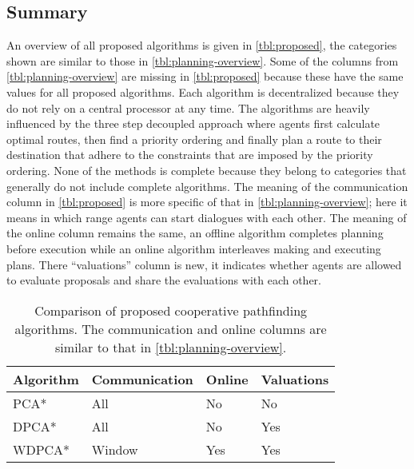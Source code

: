 \subsection{Summary}
An overview of all proposed algorithms is given in \autoref{tbl:proposed}, the
categories shown are similar to those in \autoref{tbl:planning-overview}. Some
of the columns from \autoref{tbl:planning-overview} are missing in
\autoref{tbl:proposed} because these have the same values for all proposed
algorithms. Each algorithm is decentralized because they do not rely on a
central processor at any time. The algorithms are heavily influenced by the
three step decoupled approach where agents first calculate optimal routes, then
find a priority ordering and finally plan a route to their destination that
adhere to the constraints that are imposed by the priority ordering. None of
the methods is complete because they belong to categories that generally do not
include complete algorithms. The meaning of the communication column in
\autoref{tbl:proposed} is more specific of that in
\autoref{tbl:planning-overview}; here it means in which range agents can start
dialogues with each other. The meaning of the online column remains the same,
an offline algorithm completes planning before execution while an online
algorithm interleaves making and executing plans. There ``valuations'' column
is new, it indicates whether agents are allowed to evaluate proposals and share
the evaluations with each other.

\begin{table}
    \centering
    \caption{Comparison of proposed cooperative pathfinding algorithms. The
    communication and online columns are similar to that in
    \autoref{tbl:planning-overview}.}
    \label{tbl:proposed}
    \begin{tabular}{l|l|l|l}
        Algorithm & Communication & Online & Valuations \\ \hline
        PCA*   & All & No & No \\
        DPCA*  & All & No & Yes \\
        WDPCA* & Window & Yes & Yes \\
    \end{tabular}
\end{table}